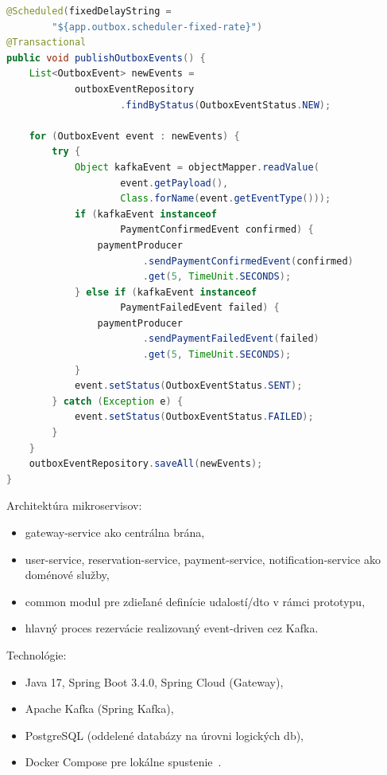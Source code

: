 \begin{lstlisting}[language=Java, breaklines=true, caption={Outbox scheduler -- polling a publikácia udalostí do Kafka (OutboxEventPublisher.java)}]
@Scheduled(fixedDelayString =
        "${app.outbox.scheduler-fixed-rate}")
@Transactional
public void publishOutboxEvents() {
    List<OutboxEvent> newEvents =
            outboxEventRepository
                    .findByStatus(OutboxEventStatus.NEW);

    for (OutboxEvent event : newEvents) {
        try {
            Object kafkaEvent = objectMapper.readValue(
                    event.getPayload(),
                    Class.forName(event.getEventType()));
            if (kafkaEvent instanceof
                    PaymentConfirmedEvent confirmed) {
                paymentProducer
                        .sendPaymentConfirmedEvent(confirmed)
                        .get(5, TimeUnit.SECONDS);
            } else if (kafkaEvent instanceof
                    PaymentFailedEvent failed) {
                paymentProducer
                        .sendPaymentFailedEvent(failed)
                        .get(5, TimeUnit.SECONDS);
            }
            event.setStatus(OutboxEventStatus.SENT);
        } catch (Exception e) {
            event.setStatus(OutboxEventStatus.FAILED);
        }
    }
    outboxEventRepository.saveAll(newEvents);
}
\end{lstlisting}

Architektúra mikroservisov:
\begin{itemize}
    \item gateway-service ako centrálna brána,
    \item user-service, reservation-service, payment-service, notification-service ako doménové služby,
    \item common modul pre zdieľané definície udalostí/\acrshort{dto} v rámci prototypu,
    \item hlavný proces rezervácie realizovaný event-driven cez Kafka.
\end{itemize}

Technológie:
\begin{itemize}
    \item Java 17, Spring Boot 3.4.0, Spring Cloud (Gateway),
    \item Apache Kafka (Spring Kafka),
    \item PostgreSQL (oddelené databázy na úrovni logických \gls{db}),
    \item Docker Compose pre lokálne spustenie~\cite{DockerCompose2025}.
\end{itemize}

